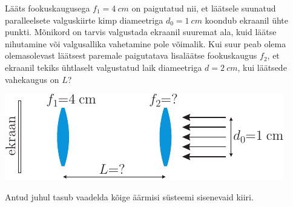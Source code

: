 
Lääts fookuskaugusega $f_1=\SI{4}{cm}$ on paigutatud nii, et läätsele suunatud paralleelsete valguskiirte kimp diameetriga $d_0=\SI{1}{cm}$ koondub ekraanil ühte punkti. Mõnikord on tarvis valgustada ekraanil suuremat ala, kuid läätse nihutamine või valgusallika vahetamine pole võimalik. Kui suur peab olema olemasolevast läätsest paremale paigutatava lisaläätse fookuskaugus $f_2$, et ekraanil tekiks ühtlaselt valgustatud laik diameetriga $d=\SI{2}{cm}$, kui läätsede vahekaugus on $L$?
\begin{center}
\includegraphics[scale=1.5]{2015-v3g-02-valgustamine-yles}
\end{center}

\hint
Antud juhul tasub vaadelda kõige äärmisi süsteemi sisenevaid kiiri.

